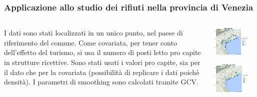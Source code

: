\documentclass[landscape,9pt]{beamer}                           %
\begin{document}
\begin{frame}
\frametitle{Applicazione allo studio dei rifiuti nella provincia di Venezia}
\begin{columns}
	\begin{column}{0.6\textwidth}
	I dati sono stati localizzati in un unico punto, nel paese di riferimento del comune.
	\newline\newline
	Come covariata, per tener conto dell'effetto del turismo, si usa il numero di posti letto pro capite in strutture ricettive.
	\newline\newline
	Sono stati usati i valori pro capite, sia per il dato che per la covariata (possibilità di replicare i dati poichè densità).
		I parametri di smoothing sono calcolati tramite GCV.

	\end{column}
	\begin{column}{0.4\textwidth}
	\begin{center}
		\includegraphics[width=0.8\textwidth]{Immagini/Dati.png}
	\end{center}
	\begin{center}
		\includegraphics[width=0.8\textwidth]{Immagini/PL.png}
	\end{center}		
	\end{column}
\end{columns}
\end{frame}
\end{document}
